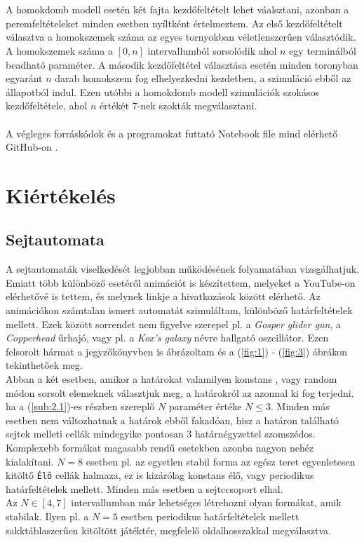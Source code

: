 \begin{multicols}{2}
\\ \\
A homokdomb modell esetén két fajta kezdőfeltételt lehet váalsztani, azonban a peremfeltételeket minden esetben nyíltként értelmeztem. Az első kezdőfeltételt választva a homokszemek száma az egyes tornyokban véletlenszerűen választódik. A homokszemek száma a $\left[ 0, n \right]$ intervallumból sorsolódik ahol $n$ egy terminálból beadható paraméter. A második kezdőfeltétel választása esetén minden toronyban egyaránt $n$ darab homokszem fog elhelyezkedni kezdetben, a szimuláció ebből az állapotból indul. Ezen utóbbi a homokdomb modell szimulációk szokásos kezdőfeltétele, ahol $n$ értékét $7$-nek szokták megválasztani.
\\ \\
A végleges forráskódok és a programokat futtató Notebook file mind elérhető GitHub-on \citep{github}.

\section{Kiértékelés} \label{sec:4}
\subsection{Sejtautomata}
A sejtautomaták viselkedését legjobban működésének folyamatában vizsgálhatjuk. Emiatt több különböző esetéről animációt is készítettem, melyeket a YouTube-on elérhetővé is tettem, és melynek linkje a hivatkozások között elérhető\nocite{yt}. Az animációkon számtalan ismert automatát szimuláltam, különböző határfeltételek mellett. Ezek között sorrendet nem figyelve szerepel pl. a \emph{Gosper glider gun}, a \emph{Copperhead} űrhajó, vagy pl. a \emph{Kox's galaxy} névre hallgató oszcillátor. Ezen felsorolt hármat a jegyzőkönyvben is ábrázoltam és a (\ref{fig:1}) - (\ref{fig:3}) ábrákon tekinthetőek meg. \\
Abban a két esetben, amikor a határokat valamilyen konstans , vagy random módon sorsolt elemeknek választjuk meg, a határokról az azonnal ki fog terjedni, ha a (\ref{sub:2.1})-es részben szereplő $N$ paraméter értéke $N \leq 3$. Minden más esetben nem változhatnak a határok ebből fakadóan, hisz a határon található sejtek melleti cellák mindegyike pontosan $3$ határnégyzettel szomszédos. \\
Komplexebb formákat magasabb rendű esetekben azonba nagyon nehéz kialakítani. $N = 8$ esetben pl. az egyetlen stabil forma az egész teret egyenletesen kitöltő \texttt{Élő} cellák halmaza, ez is kizárólag konstans élő, vagy periodikus határfeltételek mellett. Minden más esetben a sejtccsoport elhal. \\
Az $N \in \left[ 4, 7 \right]$ intervallumban már lehetséges létrehozni olyan formákat, amik stabilak. Ilyen pl. a $N = 5$ esetben periodikus határfeltételek mellett sakktáblaszerűen kitöltött játéktér, megfelelő oldalhosszakkal megválasztva.


\end{multicols}
